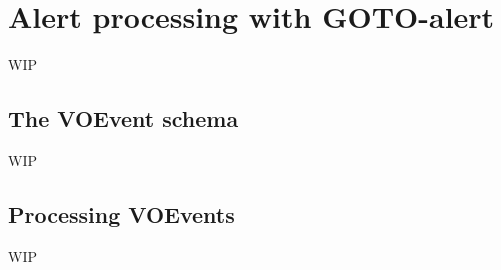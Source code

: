 
\newpage
\section{Alert processing with GOTO-alert}
\label{sec:gotoalert}
\begin{colsection}


\begin{colsection}

WIP

\end{colsection}


\subsection{The VOEvent schema}
\label{sec:voevents}
\begin{colsection}

WIP

\end{colsection}


\subsection{Processing VOEvents}
\label{sec:alert_processing}
\begin{colsection}

WIP

\end{colsection}


\end{colsection}


\newpage
